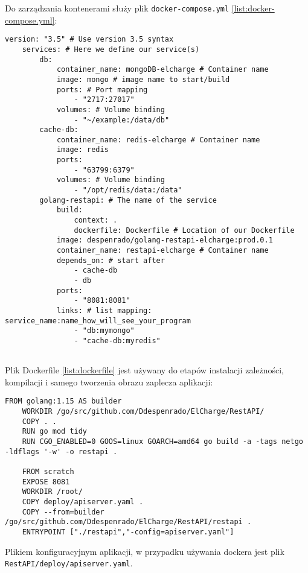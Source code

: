 Do zarządzania kontenerami służy plik \texttt{docker-compose.yml} \ref{list:docker-compose.yml}:
\begin{lstlisting}[label=list:docker-compose.yml,caption=docker-compose.yml,basicstyle=\tiny\ttfamily]
    version: "3.5" # Use version 3.5 syntax
    services: # Here we define our service(s)
        db:
            container_name: mongoDB-elcharge # Container name
            image: mongo # image name to start/build
            ports: # Port mapping
                - "2717:27017"
            volumes: # Volume binding
                - "~/example:/data/db"
        cache-db:
            container_name: redis-elcharge # Container name
            image: redis
            ports:
                - "63799:6379"
            volumes: # Volume binding
                - "/opt/redis/data:/data"
        golang-restapi: # The name of the service
            build:
                context: .
                dockerfile: Dockerfile # Location of our Dockerfile
            image: despenrado/golang-restapi-elcharge:prod.0.1
            container_name: restapi-elcharge # Container name
            depends_on: # start after
                - cache-db
                - db
            ports:
                - "8081:8081"
            links: # list mapping: service_name:name_how_will_see_your_program
                - "db:mymongo"
                - "cache-db:myredis"
    
\end{lstlisting}

Plik Dockerfile \ref{list:dockerfile} jest używany do etapów instalacji zależności, kompilacji i samego tworzenia obrazu zaplecza aplikacji:
\begin{lstlisting}[label=list:dockerfile,caption=Dockerfile,basicstyle=\tiny\ttfamily]
    FROM golang:1.15 AS builder
    WORKDIR /go/src/github.com/Ddespenrado/ElCharge/RestAPI/
    COPY . .
    RUN go mod tidy
    RUN CGO_ENABLED=0 GOOS=linux GOARCH=amd64 go build -a -tags netgo -ldflags '-w' -o restapi .
    
    FROM scratch
    EXPOSE 8081
    WORKDIR /root/
    COPY deploy/apiserver.yaml .
    COPY --from=builder /go/src/github.com/Ddespenrado/ElCharge/RestAPI/restapi .
    ENTRYPOINT ["./restapi","-config=apiserver.yaml"]
\end{lstlisting}

Plikiem konfiguracyjnym aplikacji, w przypadku używania dockera jest plik \texttt{RestAPI/deploy/apiserver.yaml}.


